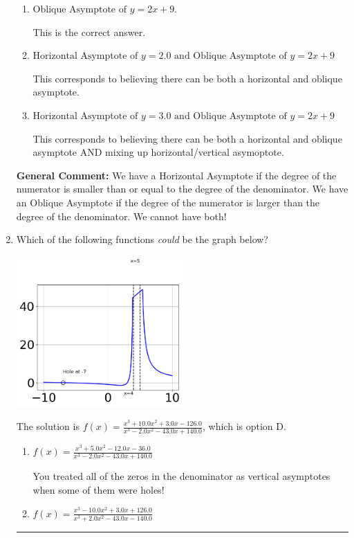 \documentclass{extbook}[14pt]
\newcommand{\litem}[1]{\item #1

\rule{\textwidth}{0.4pt}}
\begin{document}
\begin{enumerate}
{\begin{enumerate}[label=\Alph*.]
This corresponds to considering where the denominator is equal to 0 as horizontal asymptote.
\item \( \text{Oblique Asymptote of } y = 2x + 9. \)

This is the correct answer.
\item \( \text{Horizontal Asymptote of } y = 2.0 \text{ and Oblique Asymptote of } y = 2x + 9 \)

This corresponds to believing there can be both a horizontal and oblique asymptote.
\item \( \text{Horizontal Asymptote of } y = 3.0 \text{ and Oblique Asymptote of } y = 2x + 9 \)

This corresponds to believing there can be both a horizontal and oblique asymptote AND mixing up horizontal/vertical asymoptote.
\end{enumerate}

\textbf{General Comment:} We have a Horizontal Asymptote if the degree of the numerator is smaller than or equal to the degree of the denominator. We have an Oblique Asymptote if the degree of the numerator is larger than the degree of the denominator. We cannot have both!
}
\litem{
Which of the following functions \textit{could} be the graph below?

\begin{center}
    \includegraphics[width=0.5\textwidth]{../Figures/identifyGraphOfRationalFunctionCopyC.png}
\end{center}


The solution is \( f(x)=\frac{x^{3} +10.0 x^{2} +3.0 x -126.0}{x^{3} -2.0 x^{2} -43.0 x + 140.0} \), which is option D.\begin{enumerate}[label=\Alph*.]
\item \( f(x)=\frac{x^{3} +5.0 x^{2} -12.0 x -36.0}{x^{3} -2.0 x^{2} -43.0 x + 140.0} \)

You treated all of the zeros in the denominator as vertical asymptotes when some of them were holes!
\item \( f(x)=\frac{x^{3} -10.0 x^{2} +3.0 x + 126.0}{x^{3} +2.0 x^{2} -43.0 x -140.0} \)


\end{enumerate}}
\end{enumerate}
\end{document}
